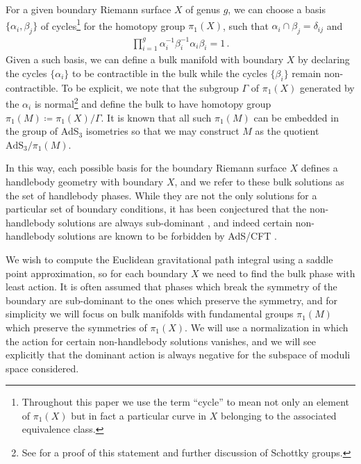 \documentclass[letterpaper,12pt]{article}
\newcommand{\ban}[1]{\begin{align}#1\end{align}}
\begin{document}
For a given boundary Riemann surface $X$ of genus $g$, we can choose a basis $\{\alpha_i, \beta_j\}$ of cycles\footnote{Throughout this paper we use the term ``cycle'' to mean not only an element of $\pi_1(X)$ but in fact a particular curve in $X$ belonging to the associated equivalence class.} for the homotopy group $\pi_1(X)$, such that $\alpha_i \cap \beta_j = \delta_{ij}$ and
\ban{
\prod_{i=1}^g \alpha_i^{-1} \beta_i^{-1} \alpha_i \beta_i = 1 \, .
}
Given a such basis, we can define a bulk manifold with boundary $X$ by declaring the cycles $\{\alpha_i\}$ to be contractible in the bulk while the cycles $\{\beta_i\}$ remain non-contractible. To be explicit, we note that the subgroup $\Gamma$ of $\pi_1(X)$ generated by the $\alpha_i$ is normal\footnote{See \cite{Ford,TZ} for a proof of this statement and further discussion of Schottky groups.} and define the bulk to have homotopy group $\pi_1(M) \coloneqq \pi_1(X)/\Gamma$.
It is known that all such $\pi_1(M)$ can be embedded in the group of AdS${}_3$ isometries so that we may construct $M$ as the quotient $\text{AdS}_3/\pi_1(M)$.

In this way, each possible basis for the boundary Riemann surface $X$ defines a handlebody geometry with boundary $X$, and we refer to these bulk solutions as the set of handlebody phases. While they are not the only solutions for a particular set of boundary conditions, it has been conjectured that the non-handlebody solutions are always sub-dominant \cite{Yin}, and indeed certain non-handlebody solutions are known to be forbidden by AdS/CFT \cite{MaldMaoz}.

We wish to compute the Euclidean gravitational path integral using a saddle point approximation, so for each boundary $X$ we need to find the bulk phase with least action. It is often assumed that phases which break the symmetry of the boundary are sub-dominant to the ones which preserve the symmetry, and for simplicity we will focus on bulk manifolds with fundamental groups $\pi_1(M)$ which preserve the symmetries of $\pi_1(X)$.  We will use a normalization in which the action for certain non-handlebody solutions vanishes, and we will see explicitly that the dominant action is always negative for the subspace of moduli space considered.
\end{document}
